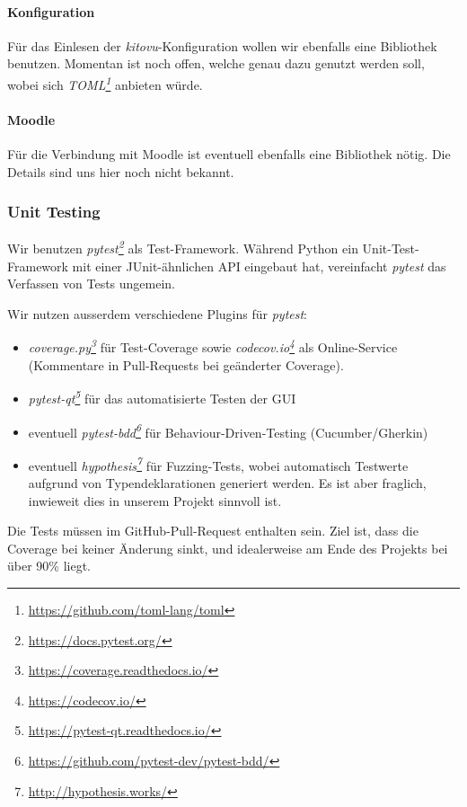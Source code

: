\documentclass[a4paper]{article}
\newcommand{\tool}[2]{\emph{#1\footnote{\url{#2}}}}
\begin{document}
\paragraph{Konfiguration}

Für das Einlesen der \emph{kitovu}-Konfiguration wollen wir ebenfalls eine Bibliothek
benutzen. Momentan ist noch offen, welche genau dazu genutzt werden
soll, wobei sich \tool{TOML}{https://github.com/toml-lang/toml} anbieten würde.

\paragraph{Moodle}

Für die Verbindung mit Moodle ist eventuell ebenfalls eine Bibliothek nötig.
Die Details sind uns hier noch nicht bekannt.

\subsubsection{Unit Testing}

Wir benutzen \tool{pytest}{https://docs.pytest.org/} als Test-Framework. Während Python ein Unit-Test-Framework mit einer JUnit-ähnlichen API
eingebaut hat, vereinfacht \emph{pytest} das Verfassen von Tests ungemein.

Wir nutzen ausserdem verschiedene Plugins für \emph{pytest}:

\begin{itemize}
\item \tool{coverage.py}{https://coverage.readthedocs.io/} für
    Test-Coverage sowie \tool{codecov.io}{https://codecov.io/}
    als Online-Service (Kommentare in Pull-Requests bei geänderter Coverage).
\item \tool{pytest-qt}{https://pytest-qt.readthedocs.io/} für das
    automatisierte Testen der GUI
\item eventuell \tool{pytest-bdd}{https://github.com/pytest-dev/pytest-bdd/} für Behaviour-Driven-Testing (Cucumber/Gherkin)
\item eventuell \tool{hypothesis}{http://hypothesis.works/} für
  Fuzzing-Tests, wobei automatisch Testwerte aufgrund von Typendeklarationen
  generiert werden. Es ist aber fraglich, inwieweit dies in unserem Projekt sinnvoll ist.
\end{itemize}

Die Tests müssen im GitHub-Pull-Request enthalten sein. Ziel ist, dass die
Coverage bei keiner Änderung sinkt, und idealerweise am Ende des Projekts bei
über 90\% liegt.
\end{document}
